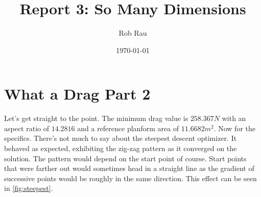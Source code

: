 \documentclass[12pt,parskip=full]{article}
\numberwithin{subsection}{section}
\begin{document}
	\vspace{-2ex}
	\title{Report 3: So Many Dimensions\vspace{-3.5ex}}
	\author{Rob Rau\vspace{-4ex}}
	\date{\today\vspace{-4ex}}
	\maketitle
	
	\section{What a Drag Part 2}
		Let's get straight to the point. The minimum drag value is $258.367 N$ with an aspect ratio of $14.2816$ and
		a reference planform area of $11.6682 m^2$. Now for the specifics. There's not much to say about the steepest
		descent optimizer. It behaved as expected, exhibiting the zig-zag pattern as it converged on the solution.
		The pattern would depend on the start point of course. Start points that were farther out would sometimes 
		head in a straight line as the gradient of successive points would be roughly in the same direction. This
		effect can be seen in \cref{fig:steepest}.
		
\end{document}
